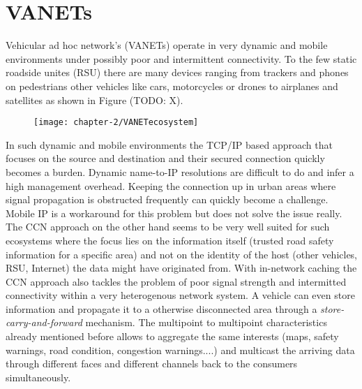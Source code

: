 \section{VANETs}

Vehicular ad hoc network's (VANETs) operate in very dynamic and mobile environments under possibly poor and intermittent connectivity. To the few static roadside unites (RSU) there are many devices ranging from trackers and phones on pedestrians other vehicles like cars, motorcycles or drones to airplanes and satellites as shown in Figure (TODO: X).

\begin{figure}[H]
\texttt{[image: chapter-2/VANETecosystem]}
\centering
\end{figure}

In such dynamic and mobile environments the TCP/IP based approach that focuses on the source and destination and their secured connection quickly becomes a burden. Dynamic name-to-IP resolutions are difficult to do and infer a high management overhead. Keeping the connection up in urban areas where signal propagation is obstructed frequently can quickly become a challenge. Mobile IP is a workaround for this problem but does not solve the issue really. The CCN approach on the other hand seems to be very well suited for such ecosystems where the focus lies on the information itself (trusted road safety information for a specific area) and not on the identity of the host (other vehicles, RSU, Internet) the data might have originated from. With in-network caching the CCN approach also tackles the problem of poor signal strength and intermitted connectivity within a very heterogenous network system. A vehicle can even store information and propagate it to a otherwise disconnected area through a \emph{store-carry-and-forward} mechanism. The multipoint to multipoint characteristics already mentioned before allows to aggregate the same interests (maps, safety warnings, road condition, congestion warnings....) and multicast the arriving data through different faces and different channels back to the consumers simultaneously.

